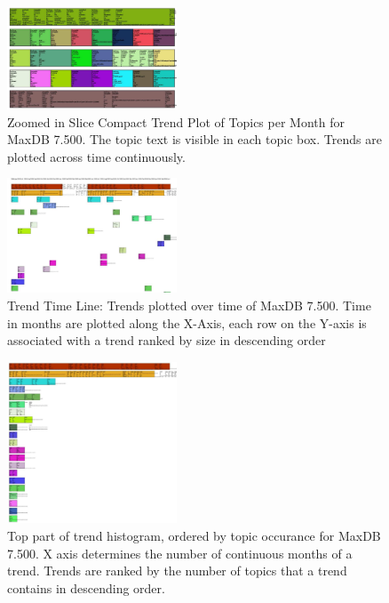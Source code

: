 \documentclass[times, 10pt,twocolumn]{article}
\begin{document}
\begin{figure}
  \centering
  \includegraphics[width=0.45\textwidth]{fixed-time-smear-plot-cropped}
  \caption{Zoomed in Slice Compact Trend Plot of Topics per Month for MaxDB 7.500. The topic text is visible in each topic box. Trends are plotted across time continuously.}
  \label{fig:zoomedsmear}
\end{figure}


\begin{figure}
  \centering
  \includegraphics[width=0.45\textwidth]{class-smear-plot-crop-scaled}
  \caption{Trend Time Line: Trends plotted over time of MaxDB 7.500. Time in months are plotted along the X-Axis, each row on the Y-axis is associated with a trend ranked by size in descending order}         
  \label{fig:trendtimeline}
\end{figure}


\begin{figure}
  \centering
  \includegraphics[width=0.45\textwidth]{histogram-cropped-scaled}
  \caption{Top part of trend histogram, ordered by topic occurance for MaxDB 7.500. X axis determines the number of continuous months of a trend. Trends are ranked  by the number of topics that a trend contains in descending order.}       
  \label{fig:histogram}
\end{figure}
\end{document}
